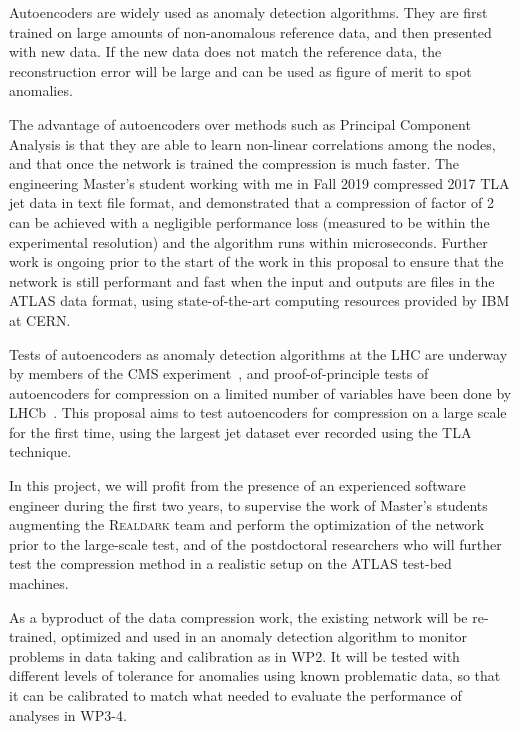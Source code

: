 

Autoencoders are widely used as anomaly detection algorithms. They are first trained on large amounts of non-anomalous reference data, and then presented with new data. If the new data does not match the reference data, the reconstruction error will be large and can be used as figure of merit to spot anomalies. 

The advantage of autoencoders over methods such as Principal Component Analysis is that they are able to learn non-linear correlations among the nodes, and that once the network is trained the compression is much faster. 
The engineering Master’s student working with me in Fall 2019 compressed 2017 TLA jet data in text file format, and demonstrated that a compression of factor of 2 can be achieved with a negligible performance loss (measured to be within the experimental resolution) and the algorithm runs within microseconds. Further work is ongoing prior to the start of the work in this proposal to ensure that the network is still performant and fast when the input and outputs are files in the ATLAS data format, using state-of-the-art computing resources provided by IBM at CERN. 

Tests of autoencoders as anomaly detection algorithms at the LHC are underway by members of the CMS experiment~\cite{CMSAE}, and proof-of-principle tests of autoencoders for compression on a limited number of variables  have been done by LHCb~\cite{ref:lhcb_ae}. 
This proposal aims to test autoencoders for compression on a large scale for the first time, using the largest jet dataset ever recorded using the TLA technique.

In this project, we will profit from the presence of an experienced software engineer during the first two years, to supervise the work of Master’s students augmenting the \textsc{Realdark} team and perform the optimization of the network prior to the large-scale test, and of the postdoctoral researchers who will further test the compression method in a realistic setup on the ATLAS test-bed machines. 

As a byproduct of the data compression work, the existing network will be re-trained, optimized and used in an anomaly detection algorithm to monitor problems in data taking and calibration as in WP2. It will be tested with different levels of tolerance for anomalies using known problematic data, so that it can be calibrated to match what needed to evaluate the performance of analyses in WP3-4. 


